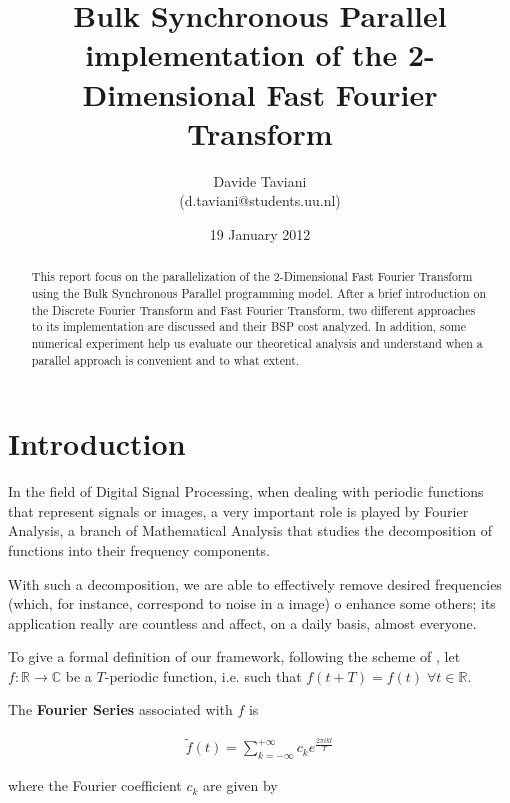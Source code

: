 \documentclass[a4paper,11pt]{article}
\newcommand{\R}{\mathbb{R}}
\newcommand{\C}{\mathbb{C}}
\begin{document}
\title{Bulk Synchronous Parallel implementation of the 2-Dimensional Fast Fourier Transform}
\author{Davide Taviani\\
(d.taviani@students.uu.nl)}
\date{19 January 2012}

\maketitle

\begin{abstract}
This report focus on the parallelization of the 2-Dimensional Fast Fourier Transform using the Bulk Synchronous Parallel programming model. After a brief introduction on the Discrete Fourier Transform and Fast Fourier Transform, two different approaches to its implementation are discussed and their BSP cost analyzed. In addition, some numerical experiment help us evaluate our theoretical analysis and understand when a parallel approach is convenient and to what extent.
\end{abstract}

\tableofcontents

\pagebreak

\section{Introduction}
In the field of Digital Signal Processing, when dealing with periodic functions that represent signals or images, a very important role is played by Fourier Analysis, a branch of Mathematical Analysis that studies the decomposition of functions into their frequency components.

With such a decomposition, we are able to effectively remove desired frequencies (which, for instance, correspond to noise in a image) o enhance some others; its application really are countless and affect, on a daily basis, almost everyone.

To give a formal definition of our framework, following the scheme of \citep{parsc}, let $f:\R \to \C$ be a $T$-periodic function, i.e. such that $f(t+T) = f(t)\;\forall t \in \R$.

The \textbf{Fourier Series} associated with $f$ is

\begin{align}
\label{fserie} \tilde{f}(t) = \sum_{k=-\infty}^{+\infty} c_k e^{\frac{2\pi i k t}{T}}
\end{align}

where the Fourier coefficient $c_k$ are given by
\end{document}
